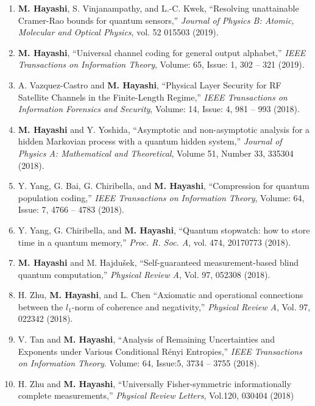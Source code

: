 \documentclass[a4paper,12pt,oneside]{article}
\begin{document}
\begin{enumerate}
\item 
\textbf{M. Hayashi}, S. Vinjanampathy, and L.-C. Kwek, 
``Resolving unattainable Cramer-Rao bounds for quantum sensors,''
{\em Journal of Physics B: Atomic, Molecular and Optical Physics},
vol. 52 015503 (2019). 

\item 
\textbf{M. Hayashi},
``Universal channel coding for general output alphabet,'' 
{\em IEEE Transactions on Information Theory},
Volume: 65, Issue: 1, 302 -- 321 (2019). 

\item 
A. Vazquez-Castro and \textbf{M. Hayashi},
``Physical Layer Security for RF Satellite Channels in the Finite-Length Regime,'' 
{\em IEEE Transactions on Information Forensics and Security},
Volume: 14, Issue: 4,  981 -- 993 (2018).

\item 
\textbf{M. Hayashi} and Y. Yoshida,
``Asymptotic and non-asymptotic analysis for a hidden Markovian process with a quantum hidden system,''
{\em Journal of Physics A: Mathematical and Theoretical}, 
Volume 51, Number 33, 335304 (2018).

\item 
Y. Yang, G. Bai, G. Chiribella, and \textbf{M. Hayashi}, 
``Compression for quantum population coding,''
{\em IEEE Transactions on Information Theory},
Volume: 64, Issue: 7, 4766 -- 4783 (2018). 

\item 
Y. Yang, G. Chiribella, and
\textbf{M. Hayashi},
``Quantum stopwatch: how to store time in a quantum memory,''
{\em Proc. R. Soc. A}, vol. 474, 20170773 (2018).

\item 
\textbf{M. Hayashi} and M. Hajdu\v{s}ek,
``Self-guaranteed measurement-based blind quantum computation,'' 
{\em Physical Review A}, Vol. 97, 052308 (2018).

\item 
H. Zhu, \textbf{M. Hayashi}, and L. Chen
``Axiomatic and operational connections between the $l_1$-norm of coherence and negativity,''
{\em Physical Review A}, Vol. 97, 022342 (2018).

\item 
V. Tan and \textbf{M. Hayashi},
``Analysis of Remaining Uncertainties and Exponents under Various Conditional R\'{e}nyi Entropies,''
{\em IEEE Transactions on Information Theory}.
Volume: 64, Issue:5, 3734 -- 3755 (2018). 

\item 
H. Zhu and \textbf{M. Hayashi},
``Universally Fisher-symmetric informationally complete measurements,''
{\em Physical Review Letters}, Vol.120, 030404 (2018)


\end{enumerate}
\end{document}
